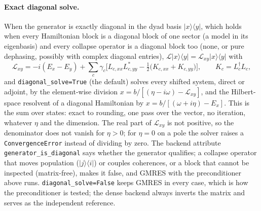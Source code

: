 \documentclass[11pt]{article}
\begin{document}
\paragraph{Exact diagonal solve.}
When the generator is exactly diagonal in the dyad basis $|x\rangle\langle y|$, which holds when every Hamiltonian block is a diagonal block of one sector (a model in its eigenbasis) and every collapse operator is a diagonal block too (none, or pure dephasing, possibly with complex diagonal entries), \(\mathcal{L}|x\rangle\langle y|=\mathcal{L}_{xy}|x\rangle\langle y|\) with
\begin{equation}
\mathcal{L}_{xy}=-i(E_x-E_y)+\sum_c\gamma_c\Big[L_{c,xx}L^{*}_{c,yy}-\tfrac12\big(K_{c,xx}+K_{c,yy}\big)\Big],\qquad K_c=L_c^\dagger L_c ,
\end{equation}
and \texttt{diagonal\_solve=True} (the default) solves every shifted system, direct or adjoint, by the element-wise division \(x=b/[(\eta-i\omega)-\mathcal{L}_{xy}]\), and the Hilbert-space resolvent of a diagonal Hamiltonian by \(x=b/[(\omega+i\eta)-E_x]\). This is the sum over states: exact to rounding, one pass over the vector, no iteration, whatever \(\eta\) and the dimension. The real part of \(\mathcal{L}_{xy}\) is not positive, so the denominator does not vanish for \(\eta>0\); for \(\eta=0\) on a pole the solver raises a \texttt{ConvergenceError} instead of dividing by zero. The backend attribute \texttt{generator\_is\_diagonal} says whether the generator qualifies; a collapse operator that moves population (\(|j\rangle\langle i|\)) or couples coherences, or a block that cannot be inspected (matrix-free), makes it false, and GMRES with the preconditioner above runs. \texttt{diagonal\_solve=False} keeps GMRES in every case, which is how the preconditioner is tested; the dense backend always inverts the matrix and serves as the independent reference.
\end{document}
